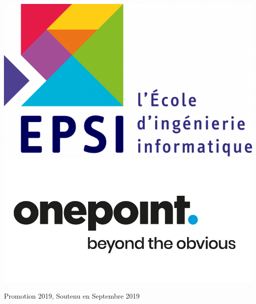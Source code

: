 \begin{titlepage}
\includegraphics[scale=0.2]{img/epsi.png}\\[1cm] %

\includegraphics[scale=0.15]{img/onepoint.jpg}\\[1cm] %

\begin{flushright} \large 
	Promotion 2019, Soutenu en Septembre 2019
\end{flushright}

\vfill %

\end{titlepage}